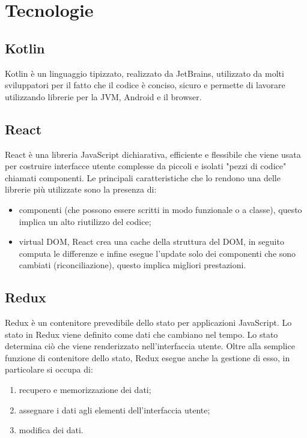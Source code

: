
\chapter{Tecnologie}
\label{cap:tecnologie-strumenti}


\section{Kotlin}
Kotlin è un linguaggio tipizzato, realizzato da JetBrains, utilizzato da molti sviluppatori per il fatto che il codice è conciso, sicuro e permette di lavorare utilizzando librerie per la JVM, Android e il browser.

\section{React}
React è una libreria JavaScript dichiarativa, efficiente e flessibile che viene usata per costruire interfacce utente complesse da piccoli e isolati "pezzi di codice" chiamati componenti. Le principali caratteristiche che lo rendono una delle librerie più utilizzate sono la presenza di:
\begin{itemize}
	\item componenti (che possono essere scritti in modo funzionale o a classe), questo implica un alto riutilizzo del codice;
	\item virtual DOM, React crea una cache della struttura del DOM, in seguito computa le differenze e infine esegue l'update solo dei componenti che sono cambiati (riconciliazione), questo implica migliori prestazioni. 
\end{itemize}

\section{Redux}
Redux è un contenitore prevedibile dello stato per applicazioni JavaScript. Lo stato in Redux viene definito come dati che cambiano nel tempo. Lo stato determina ciò che viene renderizzato nell'interfaccia utente. Oltre alla semplice funzione di contenitore dello stato, Redux esegue anche la gestione di esso, in particolare si occupa di:
\begin{enumerate}
	\item recupero e memorizzazione dei dati;
	\item assegnare i dati agli elementi dell'interfaccia utente;
	\item modifica dei dati.
\end{enumerate}


